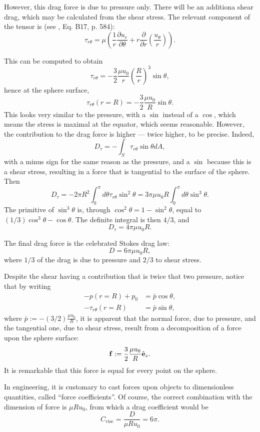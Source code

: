 However, this drag force is due to pressure only. There will be an
additiona shear drag, which may be calculated from the shear stress.
The relevant component of the tensor is (see \cite{white1991viscous},
Eq. B17, p. 584):
\[
  \tau_{r\theta} = \mu \left(
    \frac1r
    \frac{\partial u_r}{\partial \theta} +
    r \frac{\partial }{\partial r} \left( \frac{u_\theta}{r}\right) 
  \right) .
\]

This can be computed to obtain
\[
  \tau_{r\theta} = 
  - \frac32 \frac{\mu u_0}{r} \left(\frac{R}{r}\right)^3 \sin\theta ,
\]
hence at the sphere surface,
\[
  \tau_{r\theta} (r=R) =  - \frac32 \frac{\mu u_0}{R}  \sin\theta .
\]
This looks very similar to the pressure, with a $\sin$ instead of a
$\cos$, which means the stress is maximal at the equator, which seems
reasonable. However, the contribution to the drag force is higher ---
twice higher, to be precise. Indeed,
\[
  D_\tau =  - \int_S  \tau_{r\theta} \sin\theta dA ,
\]
with a minus sign for the same reason as the pressure, and a $\sin$
because this is a shear stress, resulting in a force that is
tangential to the surface of the sphere.  Then
\[
  D_\tau =
  - 2\pi R^2 \int_0^\pi d\theta   \tau_{r\theta} \sin^2\theta  =
  3 \pi \mu u_0 R  \int_0^\pi d\theta \sin^3\theta .
\]
The primitive of $\sin^3\theta$ is, through
$\cos^2\theta=1-\sin^2\theta$, equal to
$(1/3) \cos^3\theta - \cos\theta$. The definite integral is then $4/3$, and
\[
  D_\tau = 4 \pi \mu u_0 R .
\]

The final drag force is the celebrated Stokes drag law: 
\[
  D = 6 \pi \mu u_0 R ,
\]
where $1/3$ of the drag is due to pressure and $2/3$ to shear stress.

Despite the shear having a contribution that is twice that two
pressure, notice that by writing 
\begin{align*}
  - p(r=R) + p_0 &= \bar{p} \cos\theta,  \\
  -\tau_{r\theta} (r=R) &= \bar{p} \sin\theta,  
\end{align*}
where $\bar{p} := - (3/2) \frac{\mu u_0}{R}$, it is apparent that the
normal force, due to pressure, and the tangential one, due to shear
stress, result from a decomposition of a force upon the sphere surface:
\[
  \mathbf{f} := \frac32 \frac{\mu u_0}{R} \hat{\mathbf{e}}_z .
\]
It is remarkable that this force is equal for every point on the
sphere.


In engineering, it is customary to cast forces upon objects to
dimensionless quantities, called ``force coefficients''.  Of course, the correct combination with the dimension
of force is $\mu R u_0$, from which a drag coefficient would be
\[
  C_\mathrm{visc} = \frac{ D }{ \mu R u_0 } = 6\pi .
\]

